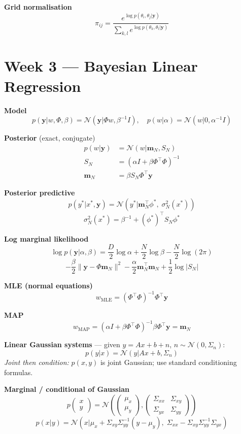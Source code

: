 \documentclass[9pt,a4paper]{extarticle}
\newcommand{\N}{\mathcal{N}}
\renewcommand{\vec}[1]{\bm{#1}}
\begin{document}
\textbf{Grid normalisation}
\[
\pi_{ij} = \frac{e^{\log p(\theta_i,\theta_j|\vec{y})}}{\sum_{k,l} e^{\log p(\theta_k,\theta_l|\vec{y})}}
\]

\section{Week 3 — Bayesian Linear Regression}

\textbf{Model}
\[
p(\vec{y}|w,\Phi,\beta) = \N(\vec{y}|\Phi w,\beta^{-1}I),\quad p(w|\alpha)=\N(w|0,\alpha^{-1}I)
\]

\textbf{Posterior} (exact, conjugate)
\begin{align*}
p(w|\vec{y}) &= \N(w|\vec{m}_N,S_N) \\
S_N &= (\alpha I + \beta\Phi^\top\Phi)^{-1} \\
\vec{m}_N &= \beta S_N \Phi^\top \vec{y}
\end{align*}

\textbf{Posterior predictive}
\[
p(y^*|x^*,\vec{y}) = \N(y^*|\vec{m}_N^\top\phi^*,\;\sigma^2_N(x^*))
\]
\[
\sigma^2_N(x^*) = \beta^{-1} + (\phi^*)^\top S_N \phi^*
\]

\textbf{Log marginal likelihood}
\[
\log p(\vec{y}|\alpha,\beta) = \frac{D}{2}\log\alpha + \frac{N}{2}\log\beta - \frac{N}{2}\log(2\pi)
\]
\[
- \frac{\beta}{2}\|\vec{y}-\Phi\vec{m}_N\|^2 - \frac{\alpha}{2}\vec{m}_N^\top\vec{m}_N + \frac{1}{2}\log|S_N|
\]

\textbf{MLE (normal equations)}
\[
w_\text{MLE} = (\Phi^\top\Phi)^{-1}\Phi^\top \vec{y}
\]

\textbf{MAP}
\[
w_\text{MAP} = (\alpha I + \beta\Phi^\top\Phi)^{-1}\beta\Phi^\top\vec{y} = \vec{m}_N
\]

\textbf{Linear Gaussian systems} — given $y=Ax+b+n$, $n\sim\N(0,\Sigma_n)$:
\[
p(y|x) = \N(y|Ax+b,\Sigma_n)
\]
\textit{Joint then condition:} $p(x,y)$ is joint Gaussian; use standard conditioning formulas.

\textbf{Marginal / conditional of Gaussian}
\[
p\!\begin{pmatrix}x\\y\end{pmatrix}=\N\!\left(\begin{pmatrix}\mu_x\\\mu_y\end{pmatrix},\begin{pmatrix}\Sigma_{xx}&\Sigma_{xy}\\\Sigma_{yx}&\Sigma_{yy}\end{pmatrix}\right)
\]
\[
p(x|y)=\N(x|\mu_x+\Sigma_{xy}\Sigma_{yy}^{-1}(y-\mu_y),\;\Sigma_{xx}-\Sigma_{xy}\Sigma_{yy}^{-1}\Sigma_{yx})
\]
\end{document}
